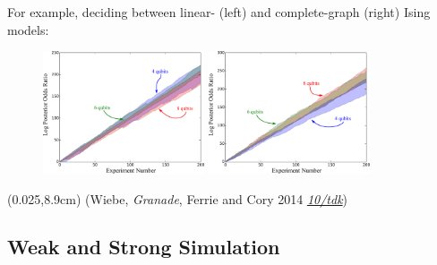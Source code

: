 \documentclass[xcolor=dvipsnames, compress]{beamer}
\renewcommand\UrlFont{\color{red}\rmfamily\itshape}
\newcommand{\shortdoi}[1]{\href{http://doi.org/#1}{\UrlFont 10/#1}}
\newcommand{\bottomnote}[1]{
  \begin{textblock*}{0.95\paperwidth} (0.025\paperwidth,8.9cm)
    {\tiny \hfill #1}
  \end{textblock*}
}
\begin{document}
\begin{frame}

  For example, deciding between linear- (left) and complete-graph (right) Ising models:

  \begin{figure}
    \centering
    \includegraphics[width=0.425\textwidth]{modelselect_linetrue}
    \includegraphics[width=0.425\textwidth]{modelselect_completetrue}
  \end{figure}

  \bottomnote{(Wiebe, \emph{Granade}, Ferrie and Cory 2014 \shortdoi{tdk})}

\end{frame}


\subsection[Weak Sim.]{Weak and Strong Simulation}
\end{document}

